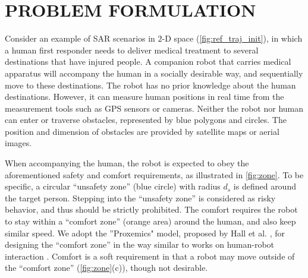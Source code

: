 \documentclass[journal]{IEEEtran}
\begin{document}
\section{PROBLEM FORMULATION}\label{sec:formulation}
	Consider an example of SAR scenarios in $2$-D space (\cref{fig:ref_traj_init}), in which a human first responder needs to deliver medical treatment to several destinations that have injured people. 
	A companion robot that carries medical apparatus will accompany the human in a socially desirable way, and sequentially move to these destinations.
	The robot has no prior knowledge about the human destinations.
	However, it can measure human positions in real time from the measurement tools such as GPS sensors or cameras.
    Neither the robot nor human can enter or traverse obstacles, represented by blue polygons and circles. 
    The position and dimension of obstacles are provided by satellite maps or aerial images.
	
	When accompanying the human, the robot is expected to obey the aforementioned safety and comfort requirements, as illustrated in \cref{fig:zone}.
    To be specific, a circular ``unsafety zone'' (blue circle) with radius $d_s$ is defined around the target person.
	Stepping into the ``unsafety zone'' is considered as risky behavior, and thus should be strictly prohibited.	
	The comfort requires the robot to stay within a ``comfort zone'' (orange area) around the human, and also keep similar speed.
    We adopt the ''Proxemics" model, proposed by Hall et al. \cite{hall1968proxemics}, for designing the ``comfort zone'' in the way similar to works on human-robot interaction \cite{mead2016autonomous,ferrer2016robot}. %
	Comfort is a soft requirement in that a robot may move outside of the ``comfort zone'' (\cref{fig:zone}(c)), though not desirable.
    
\end{document}
